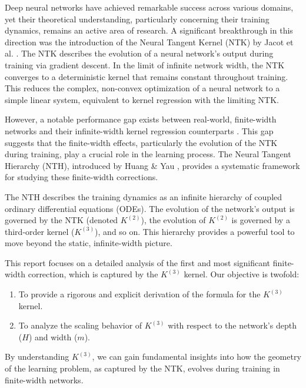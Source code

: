 \documentclass{article}
\begin{document}
Deep neural networks have achieved remarkable success across various domains, yet their theoretical understanding, particularly concerning their training dynamics, remains an active area of research. A significant breakthrough in this direction was the introduction of the Neural Tangent Kernel (NTK) by Jacot et al. \cite{jacot2018neural}. The NTK describes the evolution of a neural network's output during training via gradient descent. In the limit of infinite network width, the NTK converges to a deterministic kernel that remains constant throughout training. This reduces the complex, non-convex optimization of a neural network to a simple linear system, equivalent to kernel regression with the limiting NTK.

However, a notable performance gap exists between real-world, finite-width networks and their infinite-width kernel regression counterparts \cite{arora2019exact}. This gap suggests that the finite-width effects, particularly the evolution of the NTK during training, play a crucial role in the learning process. The Neural Tangent Hierarchy (NTH), introduced by Huang \& Yau \cite{huang2019dynamics}, provides a systematic framework for studying these finite-width corrections.

The NTH describes the training dynamics as an infinite hierarchy of coupled ordinary differential equations (ODEs). The evolution of the network's output is governed by the NTK (denoted $K^{(2)}$), the evolution of $K^{(2)}$ is governed by a third-order kernel ($K^{(3)}$), and so on. This hierarchy provides a powerful tool to move beyond the static, infinite-width picture.

This report focuses on a detailed analysis of the first and most significant finite-width correction, which is captured by the $K^{(3)}$ kernel. Our objective is twofold:
\begin{enumerate}
    \item To provide a rigorous and explicit derivation of the formula for the $K^{(3)}$ kernel.
    \item To analyze the scaling behavior of $K^{(3)}$ with respect to the network's depth ($H$) and width ($m$).
\end{enumerate}
By understanding $K^{(3)}$, we can gain fundamental insights into how the geometry of the learning problem, as captured by the NTK, evolves during training in finite-width networks.
\end{document}
